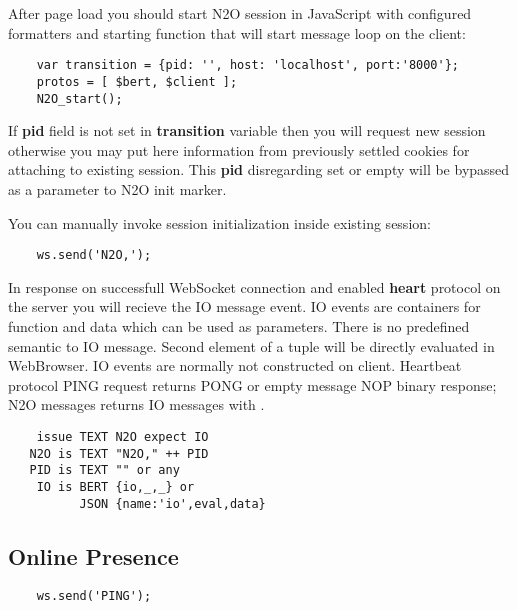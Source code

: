 After page load you should start N2O session in JavaScript with configured
formatters and starting function that will start message loop on the client:

\vspace{1\baselineskip}
\begin{lstlisting}
    var transition = {pid: '', host: 'localhost', port:'8000'};
    protos = [ $bert, $client ];
    N2O_start();
\end{lstlisting}
\vspace{1\baselineskip}

If {\bf pid} field is not set in {\bf transition} variable then you
will request new session otherwise you may put here information from
previously settled cookies for attaching to existing session. This {\bf pid}
disregarding set or empty will be bypassed as a parameter to N2O init marker.

\newpage
You can manually invoke session initialization inside existing session:

\vspace{1\baselineskip}
\begin{lstlisting}
    ws.send('N2O,');
\end{lstlisting}
\vspace{1\baselineskip}

In response on successfull WebSocket connection and enabled {\bf heart}
protocol on the server you will recieve the IO message event.
IO events are containers for function and data which can be used as parameters.
There is no predefined semantic to IO message. Second element of a tuple
will be directly evaluated in WebBrowser. IO events are normally not
constructed on client. Heartbeat protocol PING request returns PONG
or empty message NOP binary response; N2O messages returns IO messages
with .

\vspace{1\baselineskip}
\begin{lstlisting}
    issue TEXT N2O expect IO
   N2O is TEXT "N2O," ++ PID
   PID is TEXT "" or any
    IO is BERT {io,_,_} or
          JSON {name:'io',eval,data}
\end{lstlisting}
\vspace{1\baselineskip}

\subsection*{Online Presence}

\vspace{1\baselineskip}
\begin{lstlisting}
    ws.send('PING');
\end{lstlisting}
\vspace{1\baselineskip}

